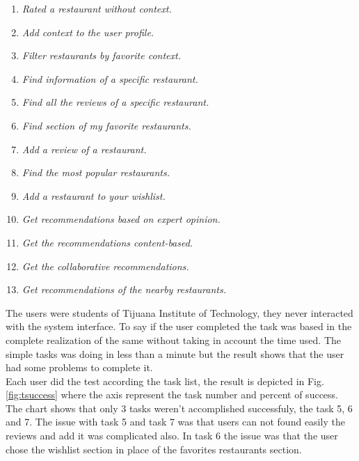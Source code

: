 \begin{enumerate} 
\item \textit{Rated a restaurant without context.}
\item \textit{Add context to the user profile.}
\item \textit{Filter restaurants by favorite context.}
\item \textit{Find information of a specific restaurant.}
\item \textit{Find all the reviews of a specific restaurant.} 
\item \textit{Find section of my favorite restaurants.}
\item \textit{Add a review of a restaurant.}
\item \textit{Find the most popular restaurants.}
\item \textit{Add a restaurant to your wishlist.}
\item \textit{Get recommendations based on expert opinion.} 
\item \textit{Get the recommendations content-based.}
\item \textit{Get the collaborative recommendations.}
\item \textit{Get recommendations of the nearby restaurants.}
\end{enumerate} 

The users were students of Tijuana Institute of Technology, they never
interacted with the system interface. To say if the user completed the task was
based in the complete realization of the same without taking in account the time
used. The simple tasks was doing in less than a minute but the result shows that
the user had some problems to complete it.\\    Each user did the test according
the task list, the result is depicted in Fig.\ref{fig:tsuccess} where the axis
represent the task number and percent of success. The chart shows that only 3
tasks weren't accomplished successfuly, the task 5, 6 and 7. The issue with task
5 and task 7 was that users can not found easily the reviews and add it was
complicated also. In task 6 the issue was that the user chose the wishlist
section in place of the favorites restaurants section.\\

\begin{figure*}
\captionsetup{justification=centering,margin=1cm}
\centering
{} %
\caption{Representation of the percent of success for each task.}
\label{fig:tsuccess}   
\end{figure*}

